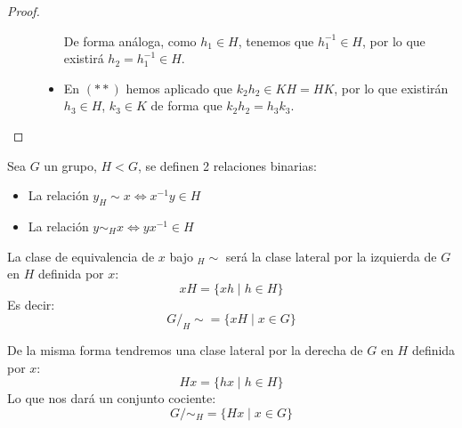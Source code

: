 \begin{prop}
\begin{proof}
\begin{description}
\begin{itemize}
                        De forma análoga, como $h_1\in H$, tenemos que $h_1^{-1}\in H$, por lo que existirá $h_2 = h_1^{-1}\in H$.
                    \item En $(\ast\ast)$ hemos aplicado que $k_2h_2 \in KH = HK$, por lo que existirán $h_3 \in H$, $k_3 \in K$ de forma que $k_2h_2 = h_3k_3$.
                \end{itemize}
        \end{description}
    \end{proof}
\end{prop}


\begin{definicion}
    Sea $G$ un grupo, $H < G$, se definen 2 relaciones binarias:
    \begin{itemize}
        \item La relación $y _H\sim x \Longleftrightarrow x^{-1}y \in H$
        \item La relación $y \sim_H x \Longleftrightarrow yx^{-1} \in H$
    \end{itemize}
    La clase de equivalencia de $x$ bajo $_H\sim$ será la clase lateral por la izquierda de $G$ en $H$ definida por $x$:
    \begin{equation*}
        xH = \{xh \mid h \in H\}
    \end{equation*}
    Es decir:
    \begin{equation*}
        G/_H\sim = \{xH \mid x\in G\}
    \end{equation*}

    De la misma forma tendremos una clase lateral por la derecha de $G$ en $H$ definida por $x$:
    \begin{equation*}
        Hx = \{hx \mid h \in H\}
    \end{equation*}
    Lo que nos dará un conjunto cociente:
    \begin{equation*}
        G/\sim_H = \{Hx \mid x \in G\}
    \end{equation*}
\end{definicion}

